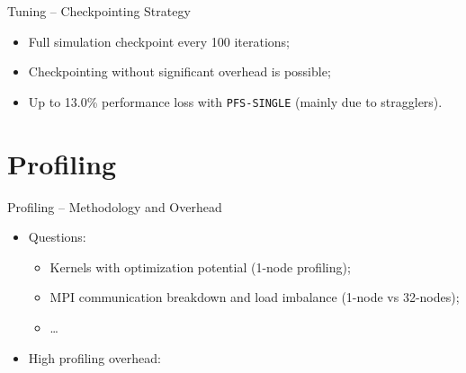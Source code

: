 \documentclass[aspectratio=169, handout]{beamer}
\begin{document}
\begin{frame}{Tuning -- Checkpointing Strategy}
    \begin{itemize}
        \item Full simulation checkpoint every 100 iterations;
    \end{itemize}

    \begin{center}
        \resizebox{0.95\textwidth}{!}{}
    \end{center}

    \begin{itemize}
        \item Checkpointing without significant overhead is possible;
        \item Up to 13.0\% performance loss with \texttt{PFS-SINGLE} (mainly due to stragglers).
    \end{itemize}
\end{frame}

\section{Profiling}

\begin{frame}{Profiling -- Methodology and Overhead}
    \begin{itemize}
        \item Questions:
        \begin{itemize}
            \item Kernels with optimization potential (1-node profiling);
            \item MPI communication breakdown and load imbalance (1-node vs 32-nodes);
            \item \ldots
        \end{itemize}
        \item High profiling overhead:
    \end{itemize}

    \begin{center}
        \resizebox{0.95\textwidth}{!}{}
    \end{center}
\end{frame}
\end{document}
